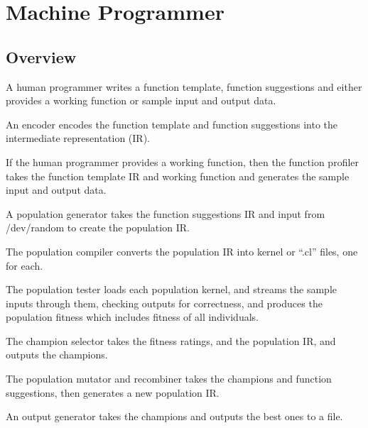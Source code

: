 \chapter{Machine Programmer}

\section{Overview}
A human programmer writes a function template, function suggestions and 
either provides a working function or sample input and output data. 

An encoder encodes the function template and function suggestions into the
intermediate representation (IR).  

If the human programmer provides a working function, then the function profiler
takes the function template IR and working function and generates the sample 
input and output data. 

A population generator takes the function suggestions IR and input from
/dev/random to create the population IR.\@

The population compiler converts the population IR into kernel or ``.cl'' files,
one for each.

The population tester loads each population kernel, and streams the sample
inputs through them, checking outputs for correctness, and produces the
population fitness which includes fitness of all individuals. 

The champion selector takes the fitness ratings, and the population IR,
and outputs the champions.

The population mutator and recombiner takes the champions and function
suggestions, then generates a new population IR.\@

An output generator takes the champions and outputs the best ones to a file. 




